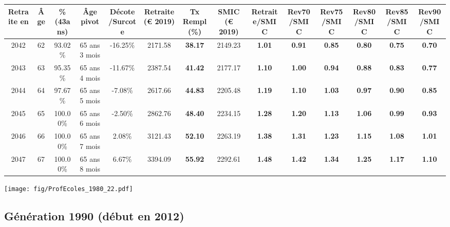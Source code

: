 \begin{adjustbox}{max width=\textwidth} 
\begin{tabular}[htb]{|c|c||c|c|c||c|c||c||c|c|c|c|c|c|} 
\hline 
 Retraite en &  Âge &  \%(43ans) &  Âge pivot &  Décote/Surcote &  Retraite (\euro{} 2019) &  Tx Rempl(\%) &  SMIC (\euro{} 2019) &  Retraite/SMIC &  Rev70/SMIC &  Rev75/SMIC &  Rev80/SMIC &  Rev85/SMIC &  Rev90/SMIC \\ 
\hline \hline 
 2042 &  62 &  93.02\% &  65 ans 3 mois &  -16.25\% &  2171.58 &  {\bf 38.17} &  2149.23 &  {\bf 1.01} &  {\bf {\color{red} 0.91}} &  {\bf {\color{red} 0.85}} &  {\bf {\color{red} 0.80}} &  {\bf {\color{red} 0.75}} &  {\bf {\color{red} 0.70}} \\ 
\hline 
 2043 &  63 &  95.35\% &  65 ans 4 mois &  -11.67\% &  2387.54 &  {\bf 41.42} &  2177.17 &  {\bf 1.10} &  {\bf 1.00} &  {\bf {\color{red} 0.94}} &  {\bf {\color{red} 0.88}} &  {\bf {\color{red} 0.83}} &  {\bf {\color{red} 0.77}} \\ 
\hline 
 2044 &  64 &  97.67\% &  65 ans 5 mois &  -7.08\% &  2617.66 &  {\bf 44.83} &  2205.48 &  {\bf 1.19} &  {\bf 1.10} &  {\bf 1.03} &  {\bf {\color{red} 0.97}} &  {\bf {\color{red} 0.90}} &  {\bf {\color{red} 0.85}} \\ 
\hline 
 2045 &  65 &  100.00\% &  65 ans 6 mois &  -2.50\% &  2862.76 &  {\bf 48.40} &  2234.15 &  {\bf 1.28} &  {\bf 1.20} &  {\bf 1.13} &  {\bf 1.06} &  {\bf {\color{red} 0.99}} &  {\bf {\color{red} 0.93}} \\ 
\hline 
 2046 &  66 &  100.00\% &  65 ans 7 mois &  2.08\% &  3121.43 &  {\bf 52.10} &  2263.19 &  {\bf 1.38} &  {\bf 1.31} &  {\bf 1.23} &  {\bf 1.15} &  {\bf 1.08} &  {\bf 1.01} \\ 
\hline 
 2047 &  67 &  100.00\% &  65 ans 8 mois &  6.67\% &  3394.09 &  {\bf 55.92} &  2292.61 &  {\bf 1.48} &  {\bf 1.42} &  {\bf 1.34} &  {\bf 1.25} &  {\bf 1.17} &  {\bf 1.10} \\ 
\hline 
\hline 
\end{tabular} 
\end{adjustbox} 
 
 \vspace{0.1cm} 

 \begin{center}\texttt{[image: fig/ProfEcoles\_1980\_22.pdf]}\end{center} \label{fig/ProfEcoles_1980_22.pdf} 

\newpage 
 
\subsection{Génération 1990 (début en 2012)} 

